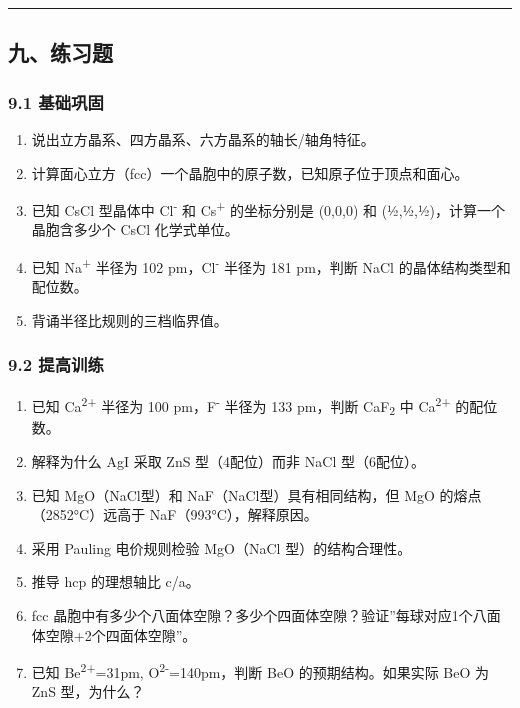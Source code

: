 \documentclass[a4paper,11pt]{ctexart}
\providecommand{\tightlist}{\setlength{\itemsep}{0pt}\setlength{\parskip}{0pt}}
\begin{document}
\begin{center}\rule{0.5\linewidth}{0.5pt}\end{center}

\subsection{九、练习题}\label{ux4e5dux7ec3ux4e60ux9898}

\subsubsection{9.1 基础巩固}\label{ux57faux7840ux5de9ux56fa}

\begin{enumerate}
\def\labelenumi{\arabic{enumi}.}
\tightlist
\item
  说出立方晶系、四方晶系、六方晶系的轴长/轴角特征。
\item
  计算面心立方（fcc）一个晶胞中的原子数，已知原子位于顶点和面心。
\item
  已知 CsCl 型晶体中 Cl\textsuperscript{-} 和 Cs\textsuperscript{+} 的坐标分别是 (0,0,0) 和 (½,½,½)，计算一个晶胞含多少个 CsCl 化学式单位。
\item
  已知 Na\textsuperscript{+} 半径为 102 pm，Cl\textsuperscript{-} 半径为 181 pm，判断 NaCl 的晶体结构类型和配位数。
\item
  背诵半径比规则的三档临界值。
\end{enumerate}

\subsubsection{9.2 提高训练}\label{ux63d0ux9ad8ux8badux7ec3}

\begin{enumerate}
\def\labelenumi{\arabic{enumi}.}
\setcounter{enumi}{5}
\tightlist
\item
  已知 Ca\textsuperscript{2+} 半径为 100 pm，F\textsuperscript{-} 半径为 133 pm，判断 CaF\textsubscript{2} 中 Ca\textsuperscript{2+} 的配位数。
\item
  解释为什么 AgI 采取 ZnS 型（4配位）而非 NaCl 型（6配位）。
\item
  已知 MgO（NaCl型）和 NaF（NaCl型）具有相同结构，但 MgO 的熔点（2852°C）远高于 NaF（993°C），解释原因。
\item
  采用 Pauling 电价规则检验 MgO（NaCl 型）的结构合理性。
\item
  推导 hcp 的理想轴比 c/a。
\item
  fcc 晶胞中有多少个八面体空隙？多少个四面体空隙？验证''每球对应1个八面体空隙+2个四面体空隙''。
\item
  已知 Be\textsuperscript{2+}=31pm, O\textsuperscript{2-}=140pm，判断 BeO 的预期结构。如果实际 BeO 为 ZnS 型，为什么？
\end{enumerate}
\end{document}
